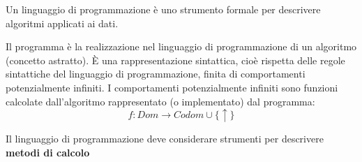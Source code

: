 \documentclass[a4paper]{article}
\begin{document}
\vspace{1em}
\noindent

\begin{definition}
  Un linguaggio di programmazione è uno strumento formale per descrivere algoritmi
  applicati ai dati.
\end{definition}

\vspace{1em}
\noindent

\begin{definition}[Programma]
  Il programma è la realizzazione nel linguaggio di programmazione di un algoritmo
  (concetto astratto).
  È una rappresentazione sintattica, cioè rispetta delle regole sintattiche del
  linguaggio di programmazione, finita di comportamenti potenzialmente infiniti.
  I comportamenti potenzialmente infiniti sono funzioni calcolate dall'algoritmo
  rappresentato (o implementato) dal programma:
  \[
    f: Dom \to Codom \cup \{\uparrow\}
  \] 

  \noindent
  Il linguaggio di programmazione deve considerare strumenti per descrivere
  \textbf{metodi di calcolo}
\end{definition}
\end{document}
